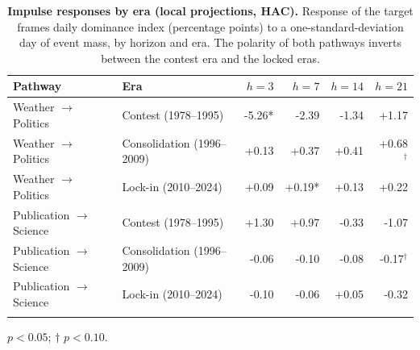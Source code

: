 \begin{table}[H]
\centering
\renewcommand{\arraystretch}{1.15}
\caption{\textbf{Impulse responses by era (local projections, HAC).}
Response of the target frame\textquotesingle s daily dominance index (percentage
points) to a one-standard-deviation day of event mass, by horizon and
era. The polarity of both pathways inverts between the contest era and
the locked eras.}
\label{tab:si_irf_era}
\vspace{0.3em}
\footnotesize
\begin{tabular}{@{}l l r r r r@{}}
\toprule
Pathway & Era & $h=3$ & $h=7$ & $h=14$ & $h=21$ \\
\midrule
Weather $\to$ Politics & Contest (1978--1995) & -5.26* & -2.39 & -1.34 & +1.17 \\
Weather $\to$ Politics & Consolidation (1996--2009) & +0.13 & +0.37 & +0.41 & +0.68$^\dagger$ \\
Weather $\to$ Politics & Lock-in (2010--2024) & +0.09 & +0.19* & +0.13 & +0.22 \\
\addlinespace
Publication $\to$ Science & Contest (1978--1995) & +1.30 & +0.97 & -0.33 & -1.07 \\
Publication $\to$ Science & Consolidation (1996--2009) & -0.06 & -0.10 & -0.08 & -0.17$^\dagger$ \\
Publication $\to$ Science & Lock-in (2010--2024) & -0.10 & -0.06 & +0.05 & -0.32 \\
\addlinespace
\bottomrule
\end{tabular}
\par\vspace{2pt}\footnotesize *$p<0.05$; $\dagger$ $p<0.10$.
\end{table}
